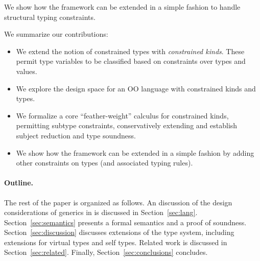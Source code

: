We show how the framework can be extended in a simple fashion to
handle structural typing constraints.

We summarize our contributions:
\begin{itemize}

\item We extend the notion of constrained types \cite{constrained-types} with {\em constrained kinds}. These permit type variables to be classified based on constraints over types and values. 
\item We explore the design space for an OO language with constrained kinds and types.
\item We formalize a core ``feather-weight'' calculus for constrained kinds, permitting subtype constraints, conservatively extending \cite{constrained-types} and establish subject reduction and type soundness.
\item 
We show how the framework can be extended in a simple fashion by adding other constraints on types (and associated typing rules).
\end{itemize}

\paragraph{Outline.}

The rest of the paper is organized as follows.
%
An discussion of the design considerations of generics in \Xten{}
is discussed in Section~\ref{sec:lang}.
%
Section~\ref{sec:semantics} presents a formal semantics and a
proof of soundness.
%
Section~\ref{sec:discussion} discusses extensions of the type system,
including extensions for virtual types and self types.
%
Related work is discussed in Section~\ref{sec:related}.
%
Finally, Section~\ref{sec:conclusions} concludes.


